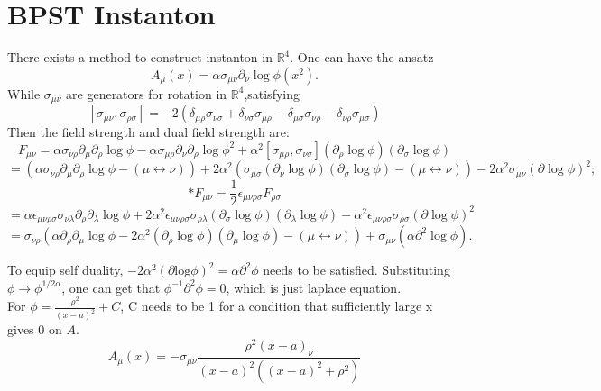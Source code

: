\documentclass{article}
\begin{document}
\section*{BPST Instanton}
There exists a method to construct instanton in $\mathbb{R}^4$. One can  have the ansatz
\[
A_{\mu}(x) = \alpha \sigma_{\mu \nu} \partial_{\nu} \log \phi(x^2).
\]
While $\sigma_{\mu\nu}$ are generators for rotation in $\mathbb{R}^4$,satisfying
\[
    [\sigma_{\mu\nu},\sigma_{\rho\sigma}] = -2\left(\delta_{\mu \rho} \sigma_{\nu \sigma}+\delta_{\nu \sigma} \sigma_{\mu \rho}-\delta_{\mu \sigma} \sigma_{\nu \rho}-\delta_{\nu \rho} \sigma_{\mu \sigma}\right)
\]
Then the field strength and dual field strength are:
\[
F_{\mu \nu} = \alpha \sigma_{\nu \rho} \partial_{\mu} \partial_{\rho} \log \phi 
              - \alpha \sigma_{\mu \rho} \partial_{\nu} \partial_{\rho} \log \phi^2 
              + \alpha^2 [\sigma_{\mu \rho}, \sigma_{\nu \sigma}] (\partial_{\rho} \log \phi)(\partial_{\sigma} \log \phi)
\]
\[
           = \left(\alpha \sigma_{\nu \rho} \partial_{\mu} \partial_{\rho} \log \phi 
              - (\mu \leftrightarrow \nu) \right) 
              + 2 \alpha^2 \left( \sigma_{\mu \sigma} (\partial_{\nu} \log \phi) (\partial_{\sigma} \log \phi) 
              - (\mu \leftrightarrow \nu) \right) 
              - 2 \alpha^2 \sigma_{\mu \nu} (\partial \log \phi)^2;
\]
\[
*F_{\mu \nu} = \frac{1}{2} \epsilon_{\mu \nu \rho \sigma} F_{\rho \sigma}
\]
\[
           = \alpha \epsilon_{\mu \nu \rho \sigma} \sigma_{\nu \lambda} \partial_{\rho} \partial_{\lambda} \log \phi 
              + 2 \alpha^2 \epsilon_{\mu \nu \rho \sigma} \sigma_{\rho \lambda} (\partial_{\sigma} \log \phi) (\partial_{\lambda} \log \phi) 
              - \alpha^2 \epsilon_{\mu \nu \rho \sigma} \sigma_{\rho \sigma} (\partial \log \phi)^2
\]
\[
           = \sigma_{\nu \rho} \left( \alpha \partial_{\rho} \partial_{\mu} \log \phi 
              - 2 \alpha^2 (\partial_{\rho} \log \phi) (\partial_{\mu} \log \phi) 
              - (\mu \leftrightarrow \nu) \right) 
              + \sigma_{\mu \nu} (\alpha \partial^2 \log \phi).
\]

To equip self duality, $-2\alpha^2(\partial \mathrm{log}\phi)^2 = \alpha\partial^2\phi$ needs to be satisfied. Substituting $\phi\rightarrow\phi^{1/2\alpha}$, one can get that $\phi^{-1}\partial^2\phi=0$, which is just laplace equation.\\
 For $\phi = \frac{\rho^2}{(x-a)^2}+C$, C needs to be 1 for a condition that sufficiently large x gives 0 on $A$.
\[
    A_\mu(x) = -\sigma_{\mu\nu}\frac{\rho^2(x-a)_\nu}{(x-a)^2((x-a)^2+\rho^2)}
\]
\end{document}
